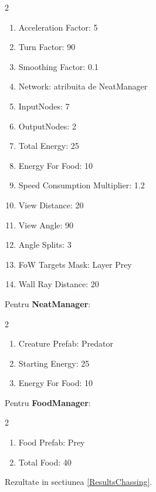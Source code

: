 \begin{multicols}{2}
    \begin{enumerate}
        \item Acceleration Factor: 5
        \item Turn Factor: 90
        \item Smoothing Factor: 0.1
        \item Network: atribuita de NeatManager
        \item InputNodes: 7
        \item OutputNodes: 2
        \item Total Energy: 25
        \item Energy For Food: 10
        \item Speed Consumption Multiplier: 1.2
        \item View Distance: 20
        \item View Angle: 90
        \item Angle Splits: 3
        \item FoW Targets Mask: Layer Prey
        \item Wall Ray Distance: 20
    \end{enumerate}
\end{multicols}
Pentru \textbf{NeatManager}:
\begin{multicols}{2}
    \begin{enumerate}
        \item Creature Prefab: Predator
        \item Starting Energy: 25
        \item Energy For Food: 10
    \end{enumerate}
\end{multicols}
Pentru \textbf{FoodManager}:
\begin{multicols}{2}
    \begin{enumerate}
        \item Food Prefab: Prey
        \item Total Food: 40
    \end{enumerate}
\end{multicols}
Rezultate in sectiunea \ref{ResultsChassing}.


